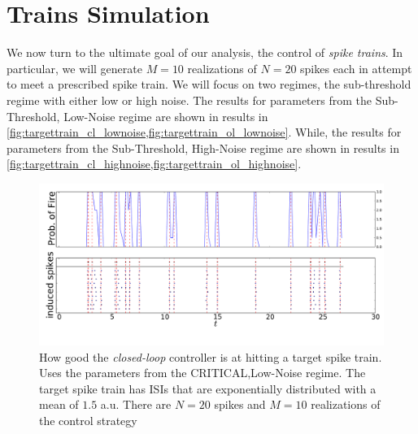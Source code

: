 \documentclass{article}
\begin{document}
\section{Trains Simulation }
We now turn to the ultimate goal of our analysis, the control of {\sl spike
trains}. In particular, we will generate $M=10$ realizations of $N=20$ spikes
each in attempt to meet a prescribed spike train. We will focus on two
regimes, the sub-threshold regime with either low or high noise. 
The results
for parameters from the Sub-Threshold, Low-Noise regime are shown in
results in \cref{fig:targettrain_cl_lownoise,fig:targettrain_ol_lownoise}.
While, the results
for parameters from the Sub-Threshold, High-Noise regime are shown in
results in \cref{fig:targettrain_cl_highnoise,fig:targettrain_ol_highnoise}.
\begin{figure}[htp]     
\begin{center}  
  \includegraphics[width=.99\textwidth]{Figs/TrainController/CRITLN_cl_trains_sim_10.pdf}
  \caption[ ]{How good the {\sl closed-loop} controller is at hitting a target
  spike train. Uses the parameters from the CRITICAL,Low-Noise regime. The
  target spike train has ISIs that are exponentially distributed with a
  mean of $1.5$ a.u. There are $N=20$ spikes and $M=10$ realizations of the
  control strategy}
  \label{fig:targettrain_cl_critlownoise}  
\end{center}
\end{figure}    
\end{document}
